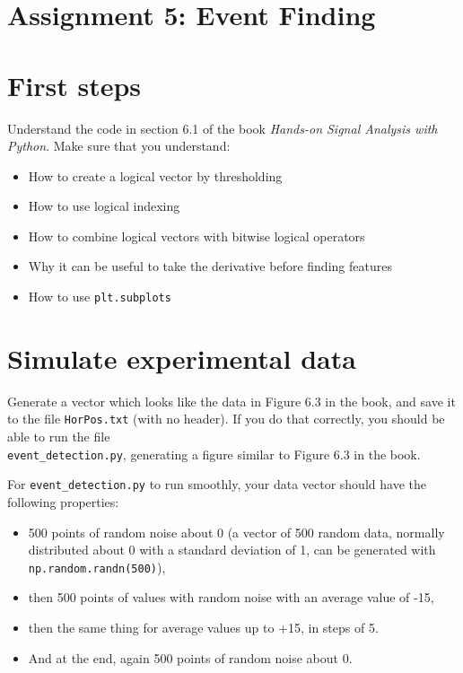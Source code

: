 \documentclass[12pt]{article}
\begin{document}
\section*{Assignment 5: Event Finding}

\section*{First steps}

Understand the code in section 6.1 of the book \emph{Hands-on Signal Analysis
with Python}. Make sure that you understand:

\begin{itemize}
    \item How to create a logical vector by thresholding
    \item How to use logical indexing
    \item How to combine logical vectors with bitwise logical operators
    \item Why it can be useful to take the derivative before finding features
    \item How to use \lstinline{plt.subplots}
\end{itemize}


\section{Simulate experimental data}%

Generate a vector which looks like the data in Figure 6.3
in the book, and save it to the file \texttt{HorPos.txt} (with no header). If you
do that correctly, you should be able to run the file \\
\lstinline{event_detection.py}, generating a figure similar to Figure
6.3 in the book.

For \lstinline{event_detection.py} to run smoothly, your data vector should have
the following properties:

\begin{itemize}
    \item 500 points of random noise about 0 (a vector of 500 random data, normally
        distributed about 0 with a standard deviation of 1, can be generated
        with \lstinline{np.random.randn(500)}),
    \item then 500 points of values with random noise with an average value of
        -15,
    \item then the same thing for average values up to +15, in steps of 5.
    \item And at the end, again 500 points of random noise about 0.
\end{itemize}
\end{document}
